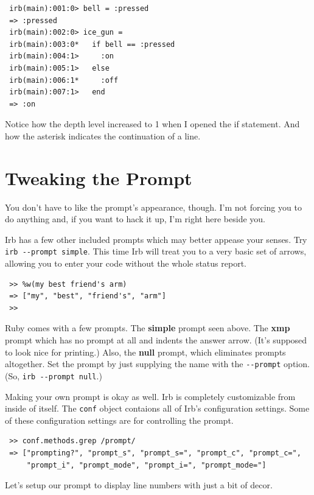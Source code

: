 \documentclass[10pt,twoside]{report}
\begin{document}
\begin{lstlisting}
 irb(main):001:0> bell = :pressed 
 => :pressed 
 irb(main):002:0> ice_gun = 
 irb(main):003:0*   if bell == :pressed 
 irb(main):004:1>     :on
 irb(main):005:1>   else 
 irb(main):006:1*     :off 
 irb(main):007:1>   end
 => :on
\end{lstlisting}

Notice how the depth level increased to 1 when I opened the if
statement. And how the asterisk indicates the continuation of a line.

\section{Tweaking the Prompt}

You don't have to like the prompt's appearance, though. I'm not
forcing you to do anything and, if you want to hack it up, I'm right
here beside you.

Irb has a few other included prompts which may better appease your
senses. Try \lstinline[breaklines=false]|irb --prompt simple|. This time Irb will treat you to a
very basic set of arrows, allowing you to enter your code without the
whole status report.

\begin{lstlisting}
 >> %w(my best friend's arm) 
 => ["my", "best", "friend's", "arm"]
 >>
\end{lstlisting}

Ruby comes with a few prompts. The \textbf{simple} prompt seen
above. The \textbf{xmp} prompt which has no prompt at all and indents
the answer arrow. (It's supposed to look nice for printing.) Also, the
\textbf{null} prompt, which eliminates prompts altogether. Set the
prompt by just supplying the name with the
\lstinline[breaklines=false]|--prompt| option. (So,
\lstinline[breaklines=false]|irb --prompt null|.)

Making your own prompt is okay as well. Irb is completely customizable
from inside of itself. The \lstinline[breaklines=false]|conf| object
contaions all of Irb's configuration settings. Some of these
configuration settings are for controlling the prompt.

\begin{lstlisting}
 >> conf.methods.grep /prompt/ 
 => ["prompting?", "prompt_s", "prompt_s=", "prompt_c", "prompt_c=",
     "prompt_i", "prompt_mode", "prompt_i=", "prompt_mode="]
\end{lstlisting}

Let's setup our prompt to display line numbers with just a bit of
decor.
\end{document}
